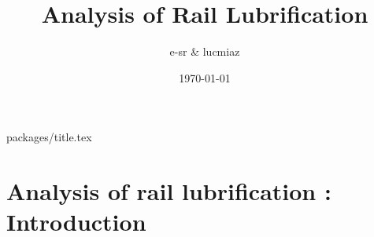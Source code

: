 \documentclass{article}
\author{e-sr \& lucmiaz}
\date{\today}
\title{Analysis of Rail Lubrification}
\begin{document}
{packages/title.tex}

\tableofcontents
\newpage
\section{Analysis of rail lubrification : Introduction}
\end{document}
